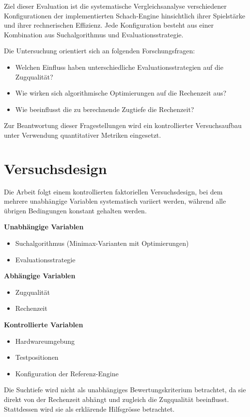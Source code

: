 Ziel dieser Evaluation ist die systematische Vergleichsanalyse verschiedener Konfigurationen der implementierten Schach-Engine hinsichtlich ihrer Spielstärke und ihrer rechnerischen Effizienz.
Jede Konfiguration besteht aus einer Kombination aus Suchalgorithmus und Evaluationsstrategie.

Die Untersuchung orientiert sich an folgenden Forschungsfragen:
\begin{itemize}
\item Welchen Einfluss haben unterschiedliche Evaluationsstrategien auf die Zugqualität?
\item Wie wirken sich algorithmische Optimierungen auf die Rechenzeit aus?
\item Wie beeinflusst die zu berechnende Zugtiefe die Rechenzeit?
\end{itemize}

Zur Beantwortung dieser Fragestellungen wird ein kontrollierter Versuchsaufbau unter Verwendung quantitativer Metriken eingesetzt.

\section{Versuchsdesign}
Die Arbeit folgt einem kontrollierten faktoriellen Versuchsdesign, bei dem mehrere unabhängige Variablen systematisch variiert werden, während alle übrigen Bedingungen konstant gehalten werden.

\textbf{Unabhängige Variablen}
\begin{itemize}
\item Suchalgorithmus (Minimax-Varianten mit Optimierungen)
\item Evaluationsstrategie
\end{itemize}

\textbf{Abhängige Variablen}
\begin{itemize}
\item Zugqualität
\item Rechenzeit
\end{itemize}

\textbf{Kontrollierte Variablen}
\begin{itemize}
\item Hardwareumgebung
\item Testpositionen
\item Konfiguration der Referenz-Engine
\end{itemize}

Die Suchtiefe wird nicht als unabhängiges Bewertungskriterium betrachtet, da sie direkt von der Rechenzeit abhängt und zugleich die Zugqualität beeinflusst.
Stattdessen wird sie als erklärende Hilfsgrösse betrachtet.

